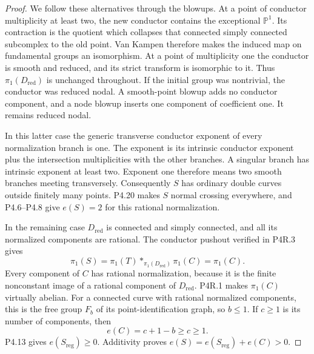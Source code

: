 \begin{proof}
We follow these alternatives through the blowups. At a
point of conductor multiplicity at least two, the new
conductor contains the exceptional $\mathbb P^1$.
Its contraction is the quotient which collapses that
connected simply connected subcomplex to the old
point. Van Kampen therefore makes the induced map on
fundamental groups an isomorphism. At a point of
multiplicity one the conductor is smooth and reduced,
and its strict transform is isomorphic to it. Thus
$\pi_1(D_{\mathrm{red}})$ is unchanged throughout.
If the initial group was nontrivial, the conductor was
reduced nodal. A smooth-point blowup adds no conductor
component, and a node blowup inserts one component of
coefficient one. It remains reduced nodal.

In this latter case the generic transverse conductor
exponent of every normalization branch is one. The
exponent is its intrinsic conductor exponent plus the
intersection multiplicities with the other branches.
A singular branch has intrinsic exponent at least two.
Exponent one therefore means two smooth branches
meeting transversely. Consequently $S$ has ordinary
double curves outside finitely many points. P4.20 makes
$S$ normal crossing everywhere, and P4.6--P4.8 give
$e(S)=2$ for this rational normalization.

In the remaining case $D_{\mathrm{red}}$ is connected
and simply connected, and all its normalized components
are rational. The conductor pushout verified in P4R.3
gives
\[
 \pi_1(S)=\pi_1(T)*_{\pi_1(D_{\mathrm{red}})}\pi_1(C)
          =\pi_1(C).
\]
Every component of $C$ has rational normalization,
because it is the finite nonconstant image of a
rational component of $D_{\mathrm{red}}$. P4R.1 makes
$\pi_1(C)$ virtually abelian. For a connected curve
with rational normalized components, this is the free
group $F_b$ of its point-identification graph, so
$b\le1$. If $c\ge1$ is its number of components, then
\[
 e(C)=c+1-b\ge c\ge1.
\]
P4.13 gives $e(S_{\mathrm{reg}})\ge0$. Additivity proves
$e(S)=e(S_{\mathrm{reg}})+e(C)>0$.
\end{proof}

